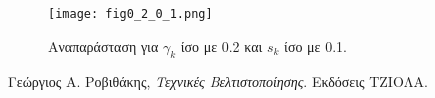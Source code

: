 \documentclass[a4paper,12pt]{report}
\begin{document}
\begin{figure}[ht!]
    \centering
    \texttt{[image: fig0\_2\_0\_1.png]} 
    \caption{Αναπαράσταση για \(\gamma_k\) ίσο με 0.2 και \(s_k\) ίσο με 0.1.}
\end{figure}


\begin{thebibliography}{1}
    Γεώργιος Α. Ροβιθάκης, \textit{Τεχνικές Βελτιστοποίησης}. Εκδόσεις ΤΖΙΟΛΑ.
\end{thebibliography}
\end{document}
